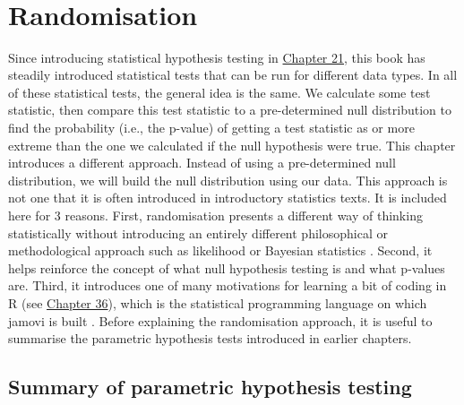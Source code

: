 \documentclass[
  openany]{scrbook}
\begin{document}
\begin{verbatim}







\end{verbatim}

\hypertarget{Chapter_35}{%
\chapter{Randomisation}\label{Chapter_35}}

Since introducing statistical hypothesis testing in \protect\hyperlink{Chapter_21}{Chapter 21}, this book has steadily introduced statistical tests that can be run for different data types.
In all of these statistical tests, the general idea is the same.
We calculate some test statistic, then compare this test statistic to a pre-determined null distribution to find the probability (i.e., the p-value) of getting a test statistic as or more extreme than the one we calculated if the null hypothesis were true.
This chapter introduces a different approach.
Instead of using a pre-determined null distribution, we will build the null distribution using our data.
This approach is not one that it is often introduced in introductory statistics texts.
It is included here for 3 reasons.
First, randomisation presents a different way of thinking statistically without introducing an entirely different philosophical or methodological approach such as likelihood \citep{Edwards1972} or Bayesian statistics \citep{Lee1997}.
Second, it helps reinforce the concept of what null hypothesis testing is and what p-values are.
Third, it introduces one of many motivations for learning a bit of coding in R (see \protect\hyperlink{Chapter_36}{Chapter 36}), which is the statistical programming language on which jamovi is built \citep{Jamovi2022, Rproject}.
Before explaining the randomisation approach, it is useful to summarise the parametric hypothesis tests introduced in earlier chapters.

\hypertarget{summary-of-parametric-hypothesis-testing}{%
\section{Summary of parametric hypothesis testing}\label{summary-of-parametric-hypothesis-testing}}
\end{document}
